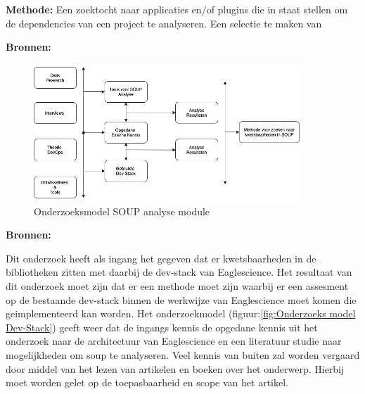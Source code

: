 \textbf{Methode: } Een zoektocht naar applicaties en/of plugins die in staat stellen om de dependencies van een project te analyseren. Een
selectie te maken van

\textbf{Bronnen: }
\begin{figure}[h!] %
  \myfloatalign
  \includegraphics[width=10cm]{gfx/OnderzoeksmodelSOUP}
  \caption{Onderzoeksmodel SOUP analyse module}
  \label{fig:OnderzoeksModelSOUPAnalyse}
\end{figure}

\textbf{Bronnen: }



Dit onderzoek heeft als ingang het gegeven dat er kwetsbaarheden in de bibliotheken zitten met daarbij de dev-stack van Eaglescience.
Het resultaat van dit onderzoek moet zijn dat er een methode moet zijn waarbij er een assesment op de bestaande dev-stack binnen de werkwijze van Eaglescience moet komen die geimplementeerd kan worden.
Het onderzoekmodel (figuur:\ref{fig:Onderzoeks model Dev-Stack}) geeft weer dat de ingangs kennis de opgedane kennis uit het onderzoek naar de architectuur van Eaglescience en een literatuur studie naar mogelijkheden om soup te analyseren.
Veel kennis van buiten zal worden vergaard door middel van het lezen van artikelen en boeken over het onderwerp.
Hierbij moet worden gelet op de toepasbaarheid en scope van het artikel.
